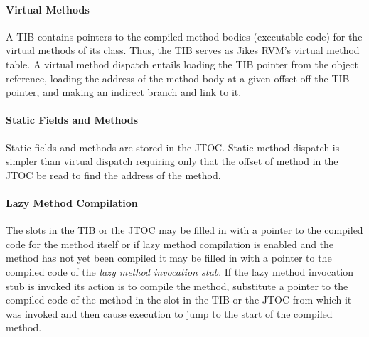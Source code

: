 \paragraph{Virtual Methods}
A TIB contains pointers to the compiled method 
bodies (executable code) for the virtual methods of its class. 
Thus, the TIB serves as Jikes RVM's virtual method table.
A virtual method dispatch entails loading the TIB pointer from 
the object reference, loading the address of the method
body at a given offset off the TIB pointer, and making an indirect
branch and link to it.

\paragraph{Static Fields and Methods} 
Static fields and methods are stored in the JTOC. Static method dispatch is 
simpler than virtual dispatch requiring only that the offset of method in the 
JTOC be read to find the address of the method. 

\paragraph{Lazy Method Compilation}
The slots in the TIB or the JTOC may be filled in with 
a pointer to the compiled code for the method itself or if lazy method 
compilation is enabled and the method has not yet been compiled 
it may be filled in with
a pointer to the compiled code of the {\em lazy method invocation stub}.
If the lazy method invocation stub is invoked its action is to compile the 
method, substitute a pointer to the compiled code of the method in the slot in
the TIB or the JTOC from which it was invoked and then 
cause execution to jump to the start of the compiled method. 

